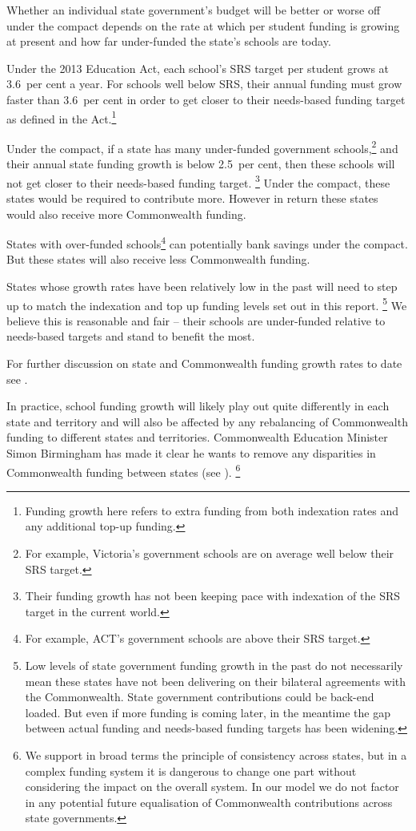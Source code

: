 \documentclass{grattan}
\begin{document}
Whether an individual state government's budget will be better or worse off under the compact depends on the rate at which per student funding is growing at present and how far under-funded the state's schools are today.

Under the 2013 Education Act, each school's SRS target per student grows at 3.6~per cent a year. For schools well below SRS, their annual funding must grow faster than 3.6~per cent in order to get closer to their needs-based funding target as defined in the Act.\footnote{Funding growth here refers to extra funding from both indexation rates and any additional top-up funding.}

Under the compact, if a state has many under-funded government schools,\footnote{For example, Victoria's government schools are on average well below their SRS target.} and their annual state funding growth is below 2.5~per cent, then these schools will not get closer to their needs-based funding target.%
\footnote{Their funding growth has not been keeping pace with indexation of the SRS target in the current world.} Under the compact, these states would be required to contribute more. However in return these states would also receive more Commonwealth funding.

States with over-funded schools\footnote{For example, ACT's government schools are above their SRS target.} can potentially bank savings under the compact.
But these states will also receive less Commonwealth funding.

States whose growth rates have been relatively low in the past will need to step up to match the indexation and top up funding levels set out in this report.%
\footnote{Low levels of state government funding growth in the past do not necessarily mean these states have not been delivering on their bilateral agreements with the Commonwealth. State government contributions could be back-end loaded. But even if more funding is coming later, in the meantime the gap between actual funding and needs-based funding targets has been widening.}
We believe this is reasonable and fair -- their schools are under-funded relative to needs-based targets and stand to benefit the most.


For further discussion on state and Commonwealth funding growth rates to date see .

In practice, school funding growth will likely play out quite differently in each state and territory and will also be affected by any rebalancing of Commonwealth funding to different states and territories.
Commonwealth Education Minister Simon Birmingham has made it clear he wants to remove any disparities in Commonwealth funding between states (see ).%
\footnote{We support in broad terms the principle of consistency across states, but in a complex funding system it is dangerous to change one part without considering the impact on the overall system. In our model we do not factor in any potential future equalisation of Commonwealth contributions across state governments.}
\end{document}
